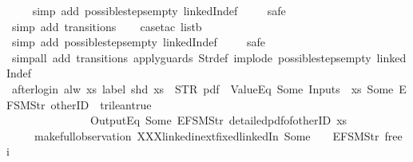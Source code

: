 \begin{isabellebody}
\ \ \ \isamarkupfalse%
\ {\isacharparenleft}simp\ add{\isacharcolon}\ possible{\isacharunderscore}steps{\isacharunderscore}empty\ linkedIn{\isacharunderscore}def{\isacharparenright}\isanewline
\ \ \ \isamarkupfalse%
\ safe{\isacharbrackleft}{}{\isacharbrackright}\isanewline
\ \ \ \ \ \ \isamarkupfalse%
\ {\isacharparenleft}simp\ add{\isacharcolon}\ transitions{\isacharparenright}{\isacharplus}\isanewline
\ \ \isamarkupfalse%
\ {\isacharparenleft}case{\isacharunderscore}tac\ listb{\isacharparenright}\isanewline
\ \ \ \isamarkupfalse%
\ {\isacharparenleft}simp\ add{\isacharcolon}\ possible{\isacharunderscore}steps{\isacharunderscore}empty\ linkedIn{\isacharunderscore}def{\isacharparenright}\isanewline
\ \ \ \isamarkupfalse%
\ safe{\isacharbrackleft}{}{\isacharbrackright}\isanewline
\ \ \isamarkupfalse%
\ {\isacharparenleft}simp{\isacharunderscore}all\ add{\isacharcolon}\ transitions\ apply{\isacharunderscore}guards\ Str{\isacharunderscore}def\ implode\ possible{\isacharunderscore}steps{\isacharunderscore}empty\ linkedIn{\isacharunderscore}def{\isacharparenright}%
\endisatagproof
{\isafoldproof}%
%
\isadelimproof
\isanewline
%
\endisadelimproof
\isanewline
{}\isamarkupfalse%
\ after{\isacharunderscore}login{\isacharcolon}\ {\isachardoublequoteopen}alw\ {\isacharparenleft}{\isasymlambda}xs{\isachardot}\ label\ {\isacharparenleft}shd\ xs{\isacharparenright}\ {\isacharequal}\ STR\ {\isacharprime}{\isacharprime}pdf{\isacharprime}{\isacharprime}\ {\isasymand}\ ValueEq\ {\isacharparenleft}Some\ {\isacharparenleft}Inputs\ {}\ xs{\isacharparenright}{\isacharparenright}\ {\isacharparenleft}Some\ {\isacharparenleft}EFSM{\isachardot}Str\ {\isacharprime}{\isacharprime}otherID{\isacharprime}{\isacharprime}{\isacharparenright}{\isacharparenright}\ {\isacharequal}\ trilean{\isachardot}true\ {\isasymlongrightarrow}\isanewline
\ \ \ \ \ \ \ \ \ \ \ \ \ \ {\isasymnot}\ OutputEq\ {\isacharbrackleft}Some\ {\isacharparenleft}EFSM{\isachardot}Str\ {\isacharprime}{\isacharprime}detailed{\isacharunderscore}pdf{\isacharunderscore}of{\isacharunderscore}otherID{\isacharprime}{\isacharprime}{\isacharparenright}{\isacharbrackright}\ xs{\isacharparenright}\isanewline
\ \ \ \ \ {\isacharparenleft}make{\isacharunderscore}full{\isacharunderscore}observation\ XXXlinkedin{\isacharunderscore}ext{\isacharunderscore}fixed{\isachardot}linkedIn\ {\isacharparenleft}Some\ {}{\isacharparenright}\ {\isacharless}{}\ {\isacharcolon}{\isacharequal}\ EFSM{\isachardot}Str\ {\isacharprime}{\isacharprime}free{\isacharprime}{\isacharprime}{\isachargreater}\ i{\isacharparenright}{\isachardoublequoteclose}\isanewline

\end{isabellebody}

